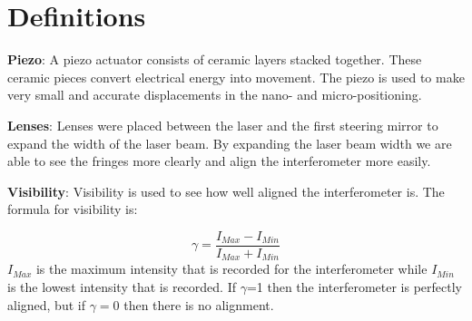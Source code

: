 \section{Definitions}

\textbf{Piezo}:
    A piezo actuator consists of ceramic layers stacked together. These ceramic pieces convert electrical energy into movement. The piezo is used to make very small and accurate displacements in the nano- and micro-positioning.

\textbf{Lenses}:
    Lenses were placed between the laser and the first steering mirror to expand the width of the laser beam. By expanding the laser beam width we are able to see the fringes more clearly and align the interferometer more easily.
    
%
\textbf{Visibility}:
    Visibility is used to see how well aligned the interferometer is. The formula for visibility is:

     \begin{equation}\label{eqn:Visibility}  
        \gamma= \frac{I_{Max} - I_{Min}}{I_{Max} + I_{Min}}
     \end{equation}    
%
$I_{Max}$ is the maximum intensity that is recorded for the interferometer while $I_{Min}$ is the lowest intensity that is recorded.  If $\gamma$=1 then the interferometer is perfectly aligned, but if $\gamma=0$ then there is no alignment. 

